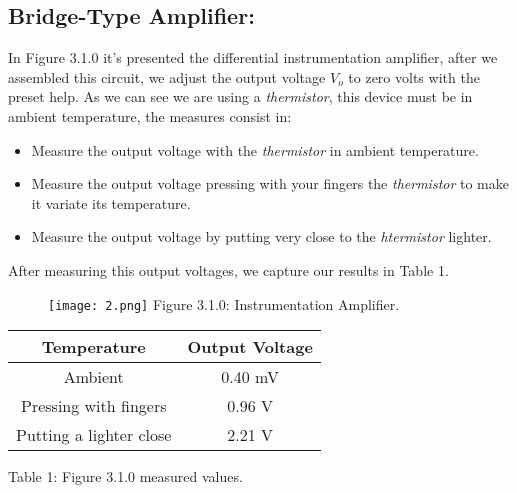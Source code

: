 \subsection{Bridge-Type Amplifier:}

In Figure 3.1.0 it's presented the differential instrumentation amplifier, after we assembled this circuit, we adjust the output voltage $V_{o}$ to zero volts with the preset help. As we can see we are using a {\itshape thermistor}, this device must be in ambient temperature, the measures consist in:

\begin{itemize}
\item Measure the output voltage with the {\itshape thermistor} in ambient temperature.
\item Measure the output voltage pressing with your fingers the {\itshape thermistor} to make it variate its temperature.
\item Measure the output voltage by putting very close to the {\itshape htermistor} lighter.
\end{itemize} \hfill

After measuring this output voltages, we capture our results in Table 1. \hfill \break

\begin{figure}[H]
\texttt{[image: 2.png]}
\linebreak \linebreak \centering Figure 3.1.0: Instrumentation Amplifier.
\end{figure} \hfill \break

\begin{center}
\begin{tabular}{c c}
\toprule \toprule
\hspace{80px} Temperature \hspace{80px} & \hspace{80px} Output Voltage \hspace{80px} \\
\midrule \midrule
Ambient & 0.40 mV \\
\cmidrule{1-2}
Pressing with fingers & 0.96 V \\
\cmidrule{1-2}
Putting a lighter close & 2.21 V \\
\bottomrule
\end{tabular}
\linebreak \linebreak Table 1: Figure 3.1.0 measured values.
\end{center}

\pagebreak